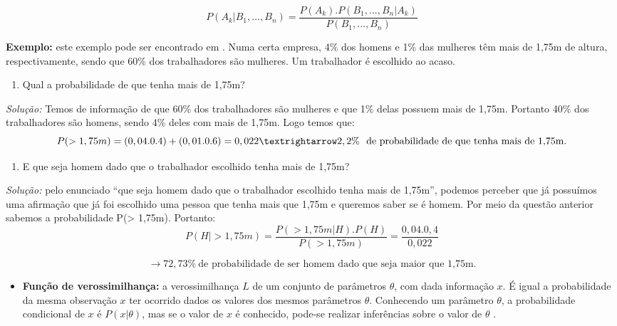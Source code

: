 \documentclass[
]{book}
\providecommand{\tightlist}{%
  \setlength{\itemsep}{0pt}\setlength{\parskip}{0pt}}
\begin{document}
\begin{equation} 
 P(A_k|B_1,...,B_n) = \frac{P(A_k).P(B_1,...,B_n|A_k)}{P(B_1,...,B_n)}
  \label{eq:bayesn}
\end{equation}

\textbf{Exemplo:} este exemplo pode ser encontrado em \citet{freund2009estatistica}. Numa certa empresa, 4\% dos homens e 1\% das mulheres têm mais de 1,75m
de altura, respectivamente, sendo que 60\% dos trabalhadores são mulheres. Um trabalhador é escolhido ao acaso.

\begin{enumerate}
\def\labelenumi{\Alph{enumi})}
\tightlist
\item
  Qual a probabilidade de que tenha mais de 1,75m?
\end{enumerate}

\emph{Solução:} Temos de informação de que 60\% dos trabalhadores são mulheres e que 1\% delas possuem mais de 1,75m. Portanto 40\% dos trabalhadores são homens, sendo 4\% deles com mais de 1,75m. Logo temos que:
\[P(> 1, 75m) = (0, 04 . 0.4) + (0, 01 . 0.6) = 0, 022 \\ → 2, 2\% \ \mbox{ de probabilidade de que tenha mais de 1,75m.}\]

\begin{enumerate}
\def\labelenumi{\Alph{enumi})}
\setcounter{enumi}{1}
\tightlist
\item
  E que seja homem dado que o trabalhador escolhido tenha mais de 1,75m?
\end{enumerate}

\emph{Solução:} pelo enunciado ``que seja homem dado que o trabalhador escolhido tenha mais de 1,75m'', podemos perceber que já possuímos uma afirmação que já foi escolhido uma pessoa que tenha mais que 1,75m e queremos saber se é homem. Por meio da questão anterior sabemos a probabilidade P(\textgreater{} 1,75m). Portanto:
\[P(H| > 1, 75m) = \frac{P(> 1, 75m|H).P(H)}{P(> 1, 75m)}=\frac{0,04.0,4}{0, 022} \]

\[→ 72,73\% \ \mbox{de probabilidade de ser homem dado que seja maior que 1,75m.}\]

\begin{itemize}
\tightlist
\item
  \textbf{Função de verossimilhança:} a verossimilhança \(L\) de um conjunto de parâmetros \(\theta\), com dada informação \(x\). É igual a probabilidade da mesma observação \(x\) ter ocorrido dados os valores dos mesmos parâmetros \(\theta\). Conhecendo um parâmetro \(\theta\), a probabilidade condicional de \(x\) é \(P(x|\theta)\), mas se o valor de \(x\) é conhecido, pode-se realizar inferências sobre o valor de \(\theta\) \citep{bolfarine2001introduccao}.
\end{itemize}
\end{document}
